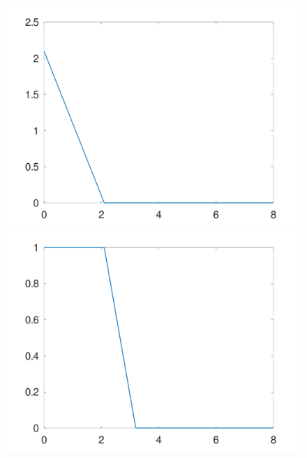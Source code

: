 \documentclass{article}
\begin{document}
\begin{figure}[!htbp]
  \flushleft
  \subfigure
  {
  \begin{minipage}[b]{.3\linewidth}
    \flushleft
  \includegraphics[scale=0.1]{figures/Assignment_G_N1_0_0.png}
  \end{minipage}
  }
  \subfigure
  {
  \begin{minipage}[b]{.3\linewidth}
    \flushleft
  \includegraphics[scale=0.1]{figures/Assignment_G_N1_1_0.png}
  \end{minipage}
  }
  \subfigure
  {
  \begin{minipage}[b]{.3\linewidth}
    \flushleft

\end{minipage}}
\end{figure}
\end{document}
